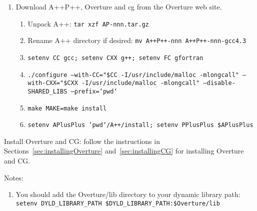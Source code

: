 \begin{enumerate}
  \item Download A++P++, Overture and cg from the Overture web site.
  \begin{enumerate}
    \item Unpack A++: {\tt tar xzf AP-nnn.tar.gz}
    \item Rename A++ directory if desired: {\tt mv A++P++-nnn  A++P++-nnn-gcc4.3}
    \item {\tt setenv CC gcc; setenv CXX g++; setenv FC gfortran}

    \item {\tt ./configure --with-CC="\$CC -I/usr/include/malloc -mlongcall" --with-CXX="\$CXX -I/usr/include/malloc -mlongcall" --disable-SHARED\_LIBS  --prefix=`pwd`}
    \item {\tt make MAKE=make install}
    \item {\tt setenv APlusPlus `pwd`/A++/install; setenv PPlusPlus \$APlusPlus}
  \end{enumerate}
\end{enumerate}

 Install Overture and CG: follow the instructions in Sections~\ref{sec:installingOverture} and~\ref{sec:installingCG}
for installing Overture and CG. 

Notes:
\begin{enumerate}
    \item You should add the Overture/lib directory to your dynamic library path:
       {\tt setenv DYLD\_LIBRARY\_PATH \${DYLD\_LIBRARY\_PATH}:\${Overture}/lib}
\end{enumerate}


